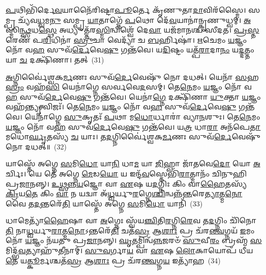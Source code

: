 \-\ul{𑌪}\-𑌥𑌿𑌭𑌿᳴𑌰𑍍𑌦𑍇\-\ul{𑌵}\-𑌯𑌾𑌨𑍈᳴𑌰𑌿𑌷𑍍𑌟𑌾\-\ul{𑌪𑍂}\-𑌰𑍍𑌤𑍇 𑌕𑍃᳴𑌣𑍁𑌤𑌾\-\ul{𑌦𑌾}\-𑌵𑌿𑌰᳴𑌸𑍍𑌮𑍈। 𑌸𑌮𑍍𑌪𑍍𑌰 𑌚𑍍𑌯᳴𑌵\-\ul{𑌧𑍍𑌵}\-𑌮\-\ul{𑌨𑍁} 𑌸𑌮𑍍𑌪𑍍𑌰 \ul{𑌯𑌾}\-𑌤𑌾𑌗𑍍𑌨𑍇᳴ \ul{𑌪}\-𑌥𑍋 𑌦𑍇᳴\-\ul{𑌵}\-𑌯𑌾𑌨𑌾॑𑌨𑍍𑌕𑍃𑌣𑍁𑌧𑍍𑌵𑌮𑍍। \ul{𑌅}\-𑌸𑍍𑌮𑌿\-\ul{𑌨𑍍𑌥𑍍𑌸}\-𑌧\-\ul{𑌸𑍍𑌥𑍇} 𑌅𑌧𑍍𑌯𑍁𑌤𑍍𑌤᳴𑌰\-\ul{𑌸𑍍𑌮𑌿}\-𑌨𑍍𑌵𑌿𑌶𑍍𑌵𑍇᳴ 𑌦𑍇\-\ul{𑌵𑌾} 𑌯𑌜᳴𑌮𑌾𑌨𑌶𑍍𑌚 𑌸𑍀𑌦𑌤। \ul{𑌪𑍍𑌰}\-\-\ul{𑌸𑍍𑌤}\-𑌰𑍇𑌣᳴ 𑌪\-\ul{𑌰𑌿}\-𑌧𑌿𑌨𑌾॑ \ul{𑌸𑍍𑌰𑍁}\-𑌚𑌾 𑌵𑍇𑌦𑍍𑌯𑌾᳴ 𑌚 \ul{𑌬}\-𑌰𑍍\mbox{}𑌹𑌿𑌷𑌾॑। \ul{𑌋}\-𑌚𑍇𑌮𑌂 \ul{𑌯}\-𑌜𑍍𑌞𑌂 𑌨𑍋᳴ 𑌵\-\ul{𑌹} 𑌸𑍁𑌵᳴\-\ul{𑌰𑍍𑌦𑍇}\-𑌵𑍇\-\ul{𑌷𑍁} 𑌗𑌨𑍍𑌤᳴𑌵𑍇। 𑌯\-\ul{𑌦𑌿}\-𑌷𑍍𑌟𑌂 𑌯𑌤𑍍𑌪᳴\-\ul{𑌰𑌾}\-𑌦𑌾\-\ul{𑌨𑌂} 𑌯\-\ul{𑌦𑍍𑌦}\-𑌤𑍍𑌤𑌂 𑌯𑌾 \ul{𑌚} 𑌦𑌕𑍍𑌷𑌿᳴𑌣𑌾। 𑌤𑌤𑍍~(31)

\-\ul{𑌅}\-𑌗𑍍𑌨𑌿𑌰𑍍𑌵𑍈॑𑌶𑍍𑌵𑌕\-\ul{𑌰𑍍𑌮}\-𑌣𑌃 𑌸𑍁𑌵᳴\-\ul{𑌰𑍍𑌦𑍇}\-𑌵𑍇𑌷𑍁᳴ 𑌨𑍋 𑌦𑌧𑌤𑍍। 𑌯𑍇𑌨𑌾᳴ \ul{𑌸}\-𑌹\-\ul{𑌸𑍍𑌰𑌂} 𑌵𑌹᳴\-\ul{𑌸𑌿} 𑌯𑍇𑌨𑌾॑𑌗𑍍𑌨𑍇 𑌸𑌰𑍍𑌵𑌵𑍇\-\ul{𑌦}\-𑌸𑌮𑍍। 𑌤𑍇\-\ul{𑌨𑍇}\-𑌮𑌂 \ul{𑌯}\-𑌜𑍍𑌞𑌂 𑌨𑍋᳴ 𑌵\-\ul{𑌹} 𑌸𑍁𑌵᳴\-\ul{𑌰𑍍𑌦𑍇}\-𑌵𑍇\-\ul{𑌷𑍁} 𑌗𑌨𑍍𑌤᳴𑌵𑍇। 𑌯𑍇𑌨𑌾॑\-\ul{𑌗𑍍𑌨𑍇} 𑌦𑌕𑍍𑌷𑌿᳴𑌣𑌾 \ul{𑌯𑍁}\-𑌕𑍍𑌤𑌾 \ul{𑌯}\-𑌜𑍍𑌞𑌂 𑌵𑌹᳴\-\ul{𑌨𑍍𑌤𑍍𑌯𑍃}\-𑌤𑍍𑌵𑌿𑌜𑌃᳴। 𑌤𑍇\-\ul{𑌨𑍇}\-𑌮𑌂 \ul{𑌯}\-𑌜𑍍𑌞𑌂 𑌨𑍋᳴ 𑌵\-\ul{𑌹} 𑌸𑍁𑌵᳴\-\ul{𑌰𑍍𑌦𑍇}\-𑌵𑍇\-\ul{𑌷𑍁} 𑌗𑌨𑍍𑌤᳴𑌵𑍇। 𑌯𑍇𑌨𑌾॑𑌗𑍍𑌨𑍇 \ul{𑌸𑍁}\-𑌕𑍃𑌤𑌃᳴ \ul{𑌪}\-𑌥𑌾 𑌮\-\ul{𑌧𑍋}\-𑌰𑍍𑌧𑌾𑌰𑌾॑ 𑌵𑍍𑌯𑌾\-\ul{𑌨}\-𑌶𑍁𑌃। 𑌤𑍇\-\ul{𑌨𑍇}\-𑌮𑌂 \ul{𑌯}\-𑌜𑍍𑌞𑌂 𑌨𑍋᳴ 𑌵\-\ul{𑌹} 𑌸𑍁𑌵᳴\-\ul{𑌰𑍍𑌦𑍇}\-𑌵𑍇\-\ul{𑌷𑍁} 𑌗𑌨𑍍𑌤᳴𑌵𑍇। 𑌯\-\ul{𑌤𑍍𑌰} 𑌧𑌾\-\ul{𑌰𑌾} 𑌅𑌨᳴𑌪𑍇\-\ul{𑌤𑌾} 𑌮𑌧𑍋॑\-\ul{𑌰𑍍𑌘𑍃}\-𑌤𑌸𑍍𑌯᳴ \ul{𑌚} 𑌯𑌾𑌃। 𑌤\-\ul{𑌦}\-𑌗𑍍𑌨𑌿𑌰𑍍𑌵𑍈॑𑌶𑍍𑌵𑌕\-\ul{𑌰𑍍𑌮}\-𑌣𑌃 𑌸𑍁𑌵᳴\-\ul{𑌰𑍍𑌦𑍇}\-𑌵𑍇𑌷𑍁᳴ 𑌨𑍋 𑌦𑌧𑌤𑍍॥~(32)

{\anuvakamend[{\-\ul{𑌆}\-𑌗\-\ul{𑌚𑍍𑌛𑌾}\-𑌤𑍍𑌤𑌦𑍍𑌵𑍍𑌯𑌾᳴\-\ul{𑌨}\-𑌶𑍁𑌸𑍍𑌤𑍇\-\ul{𑌨𑍇}\-𑌮𑌂 \ul{𑌯}\-𑌜𑍍𑌞𑌂 𑌨𑍋᳴ 𑌵\-\ul{𑌹} 𑌸𑍁𑌵᳴\-\ul{𑌰𑍍𑌦𑍇}\-𑌵𑍇\-\ul{𑌷𑍁} 𑌗𑌨𑍍𑌤᳴\-\ul{𑌵𑍇} 𑌚𑌤𑍁᳴𑌰𑍍𑌦𑌶 𑌚}]}%

𑌯𑌾𑌸𑍍𑌤𑍇᳴ 𑌅𑌗𑍍𑌨𑍇 \ul{𑌸}\-𑌮𑌿\-\ul{𑌧𑍋} 𑌯𑌾\-\ul{𑌨𑌿} 𑌧𑌾\-\ul{𑌮} 𑌯𑌾 \ul{𑌜𑌿}\-𑌹𑍍𑌵𑌾 𑌜𑌾᳴𑌤𑌵𑍇\-\ul{𑌦𑍋} 𑌯𑍋 \ul{𑌅}\-𑌰𑍍𑌚𑌿𑌃। 𑌯𑍇 𑌤𑍇᳴ 𑌅𑌗𑍍𑌨𑍇 \ul{𑌮𑍇}\-𑌡\-\ul{𑌯𑍋} 𑌯 𑌇𑌨𑍍𑌦᳴\-\ul{𑌵}\-𑌸𑍍𑌤𑍇𑌭𑌿᳴\-\ul{𑌰𑌾}\-𑌤𑍍𑌮𑌾𑌨𑌂᳴ 𑌚𑌿𑌨𑍁𑌹𑌿 𑌪𑍍𑌰\-\ul{𑌜𑌾}\-𑌨𑌨𑍍𑌨𑍍। \ul{𑌉}\-\-\ul{𑌥𑍍𑌸}\-\-\ul{𑌨𑍍𑌨}\-\-\ul{𑌯}\-𑌜𑍍𑌞𑍋 𑌵𑌾 \ul{𑌏}\-𑌷 𑌯\-\ul{𑌦}\-𑌗𑍍𑌨𑌿𑌃 𑌕𑌿𑌂 𑌵𑌾\-\ul{𑌹𑍈}\-𑌤𑌸𑍍𑌯᳴ \ul{𑌕𑍍𑌰𑌿}\-𑌯\-\ul{𑌤𑍇} 𑌕𑌿𑌂 \ul{𑌵𑌾} 𑌨 𑌯𑌦𑍍𑌵𑌾 𑌅᳴\-\ul{𑌧𑍍𑌵}\-𑌰𑍍𑌯𑍁\-\ul{𑌰}\-𑌗𑍍𑌨𑍇\-\ul{𑌶𑍍𑌚𑌿}\-𑌨𑍍𑌵𑌨𑍍𑌨᳴\-\ul{𑌨𑍍𑌤}\-𑌰𑍇\-\ul{𑌤𑍍𑌯𑌾}\-𑌤𑍍𑌮\-\ul{𑌨𑍋} 𑌵𑍈 𑌤\-\ul{𑌦}\-𑌨𑍍𑌤𑌰𑍇᳴\-\ul{𑌤𑌿} 𑌯𑌾𑌸𑍍𑌤𑍇᳴ 𑌅𑌗𑍍𑌨𑍇 \ul{𑌸}\-𑌮𑌿\-\ul{𑌧𑍋} 𑌯𑌾𑌨𑌿᳴~(33)

𑌧𑌾𑌮𑍇𑌤𑍍𑌯𑌾᳴\-\ul{𑌹𑍈}\-𑌷𑌾 𑌵𑌾 \ul{𑌅}\-𑌗𑍍𑌨𑍇𑌃 𑌸𑍍𑌵᳴𑌯\-\ul{𑌞𑍍𑌚𑌿}\-𑌤𑌿\-\ul{𑌰}\-𑌗𑍍𑌨𑌿\-\ul{𑌰𑍇}\-𑌵 𑌤\-\ul{𑌦}\-𑌗𑍍𑌨𑌿𑌂 𑌚𑌿᳴𑌨𑍋\-\ul{𑌤𑌿} 𑌨𑌾\-\ul{𑌧𑍍𑌵}\-𑌰𑍍𑌯𑍁\-\ul{𑌰𑌾}\-𑌤𑍍𑌮\-\ul{𑌨𑍋}\-\-𑌽𑌨𑍍𑌤𑌰𑍇᳴\-\ul{𑌤𑌿} 𑌚𑌤᳴\-\ul{𑌸𑍍𑌰} 𑌆\-\ul{𑌶𑌾𑌃} 𑌪𑍍𑌰 𑌚᳴𑌰\-\ul{𑌨𑍍𑌤𑍍𑌵}\-𑌗𑍍𑌨𑌯᳴ \ul{𑌇}\-𑌮𑌂 𑌨𑍋᳴ \ul{𑌯}\-𑌜𑍍𑌞𑌂 𑌨᳴𑌯𑌤𑍁 𑌪𑍍𑌰\-\ul{𑌜𑌾}\-𑌨𑌨𑍍𑌨𑍍। \ul{𑌘𑍃}\-𑌤𑌮𑍍𑌪𑌿𑌨𑍍𑌵᳴\-\ul{𑌨𑍍𑌨}\-𑌜𑌰𑍞᳴ \ul{𑌸𑍁}\-𑌵𑍀\-\ul{𑌰𑌂} 𑌬𑍍𑌰𑌹𑍍𑌮᳴ \ul{𑌸}\-𑌮𑌿𑌦𑍍𑌭᳴\-\ul{𑌵}\-𑌤𑍍𑌯𑌾𑌹𑍁᳴𑌤𑍀𑌨𑌾𑌮𑍍। \ul{𑌸𑍁}\-\-\ul{𑌵}\-𑌰𑍍𑌗𑌾\-\ul{𑌯} 𑌵𑌾 \ul{𑌏}\-𑌷 \ul{𑌲𑍋}\-𑌕𑌾𑌯𑍋𑌪᳴ 𑌧𑍀𑌯\-\ul{𑌤𑍇} 𑌯\-\ul{𑌤𑍍𑌕𑍂}\-𑌰𑍍𑌮𑌶𑍍𑌚𑌤᳴\-\ul{𑌸𑍍𑌰} 𑌆\-\ul{𑌶𑌾𑌃} 𑌪𑍍𑌰 𑌚᳴𑌰\-\ul{𑌨𑍍𑌤𑍍𑌵}\-𑌗𑍍𑌨\-\ul{𑌯} 𑌇𑌤𑍍𑌯𑌾᳴𑌹~(34)

